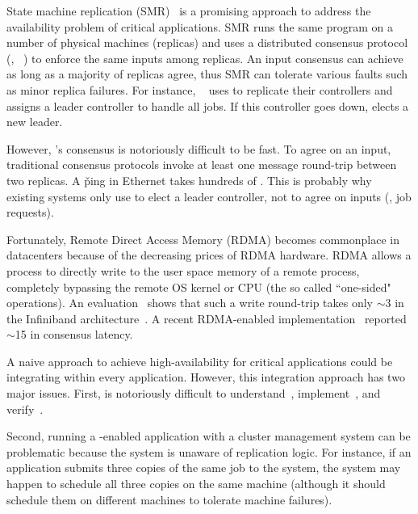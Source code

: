State machine replication (SMR)~\cite{paxos} is a promising approach 
to address the availability problem of critical applications. SMR runs the 
same program on a number of physical machines (replicas) and uses a distributed 
consensus protocol (\eg, 
\paxos~\cite{paxos:practical,paxos,paxos:simple,paxos:complex,epaxos:sosp13}) 
to enforce the same inputs among replicas. An input consensus can achieve as 
long as a majority of replicas agree, thus SMR can tolerate various faults such 
as minor replica failures. For instance, 
\mesos~\cite{borg:eurosys15,mesos:nsdi11} uses \paxos to replicate their 
controllers and assigns a leader controller to handle all jobs. If this 
controller goes down, \paxos elects a new leader.



However, \paxos's consensus is notoriously difficult to be fast. 
To agree on an input, traditional consensus protocols invoke at least one 
message round-trip between two replicas. A \v{ping} in Ethernet 
takes hundreds of \us. This is probably why existing 
systems only use \paxos to elect a leader controller, not to agree on inputs 
(\ie, job requests).

Fortunately, Remote Direct Access Memory (RDMA) becomes commonplace in 
datacenters because of the decreasing prices of RDMA hardware. RDMA allows a 
process to directly write to the user space memory of a remote process, 
completely bypassing the remote OS kernel or CPU (the so called ``one-sided" 
operations). An evaluation~\cite{pilaf:usenix14} shows that such a write 
round-trip takes only $\sim$3 \us in the Infiniband 
architecture~\cite{infiniband}. A recent 
RDMA-enabled \paxos implementation~\cite{dare:hpdc15} reported 
$\sim$15 \us in consensus latency.

A naive approach to achieve high-availability for critical applications could 
be integrating \paxos within every application. However, this integration 
approach has two major issues. First, \paxos is notoriously difficult 
to understand~\cite{raft:usenix14}, implement~\cite{paxos:practical}, and 
verify~\cite{demeter:sosp11}.

Second, running a \paxos-enabled application with a 
cluster management system can be problematic because the system is unaware 
of replication logic. For instance, if an application submits three copies of 
the same job to the system, the system may happen to schedule all three 
copies on the same machine (although it should schedule them on 
different machines to tolerate machine failures).

